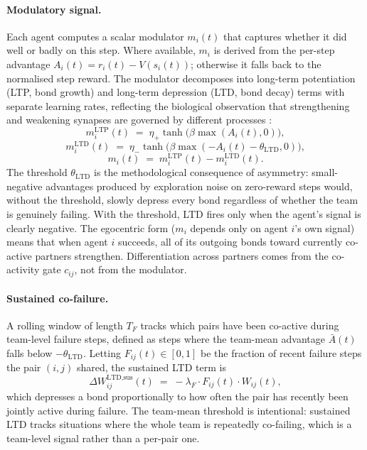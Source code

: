 \documentclass{article}
\theoremstyle{plain}
\theoremstyle{definition}
\theoremstyle{remark}
\begin{document}
\paragraph{Modulatory signal.}
Each agent computes a scalar modulator $m_i(t)$ that captures whether it
did well or badly on this step. Where available, $m_i$ is derived from the
per-step advantage $A_i(t) = r_i(t) - V(s_i(t))$; otherwise it falls back
to the normalised step reward. The modulator decomposes into long-term
potentiation (LTP, bond growth) and long-term depression (LTD, bond decay)
terms with separate learning rates, reflecting the biological observation
that strengthening and weakening synapses are governed by different
processes \cite{lazari2022hebbian}:
\[
m^{\text{LTP}}_i(t) \;=\; \eta_+ \tanh\!\big(\beta \max(A_i(t), 0)\big),
\]
\[
m^{\text{LTD}}_i(t) \;=\; \eta_- \tanh\!\big(\beta \max(-A_i(t) - \theta_{\text{LTD}}, 0)\big),
\]
\[
m_i(t) \;=\; m^{\text{LTP}}_i(t) - m^{\text{LTD}}_i(t).
\]
The threshold $\theta_{\text{LTD}}$ is the methodological consequence of asymmetry: small-negative advantages produced by exploration noise on zero-reward steps would, without the threshold, slowly depress every bond regardless of whether the team is genuinely failing. With the threshold, LTD fires only when the agent's signal is clearly negative. The egocentric form ($m_i$ depends only on agent $i$'s own signal) means that when agent $i$ succeeds, all of its outgoing bonds toward currently co-active partners strengthen. Differentiation across partners comes from the co-activity gate $c_{ij}$, not from the modulator.

\paragraph{Sustained co-failure.}
A rolling window of length $T_F$ tracks which pairs have been co-active during team-level failure steps, defined as steps where the team-mean advantage $\bar{A}(t)$ falls below $-\theta_{\text{LTD}}$. Letting $F_{ij}(t) \in [0, 1]$ be the fraction of recent failure steps the pair $(i, j)$ shared, the sustained LTD term is
\[
\Delta W^{\text{LTD,sus}}_{ij}(t) \;=\; -\lambda_F \cdot F_{ij}(t) \cdot W_{ij}(t),
\]
which depresses a bond proportionally to how often the pair has recently been jointly active during failure. The team-mean threshold is intentional: sustained LTD tracks situations where the whole team is repeatedly co-failing, which is a team-level signal rather than a per-pair one.
\end{document}
